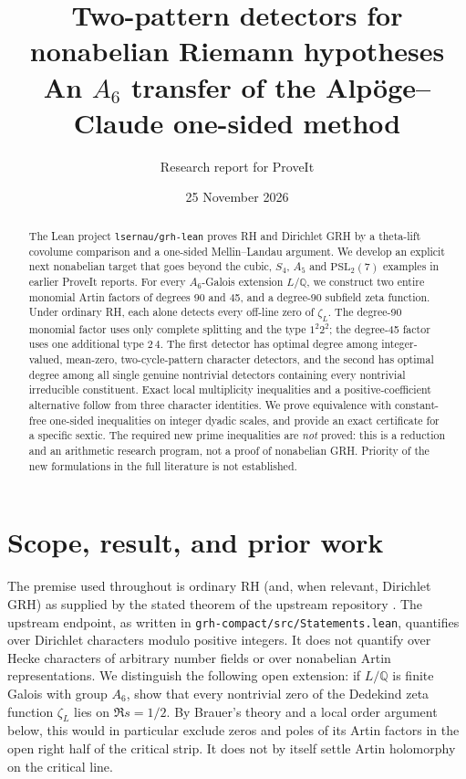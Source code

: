 \documentclass[11pt,letterpaper]{article}
\title{\color{ink}\bfseries Two-pattern detectors for nonabelian Riemann hypotheses\\[5pt]\large An $A_6$ transfer of the Alp\"oge--Claude one-sided method}
\author{Research report for ProveIt}
\date{25 November 2026}
\theoremstyle{remark}\newtheorem{remark}[theorem]{Remark}
\newcommand{\Q}{\mathbb Q}\newcommand{\C}{\mathbb C}\newcommand{\R}{\mathbb R}
\newcommand{\code}[1]{\nolinkurl{#1}}
\begin{document}
\maketitle
\begin{abstract}
The Lean project \code{lsernau/grh-lean} proves RH and Dirichlet GRH by a theta-lift covolume comparison and a one-sided Mellin--Landau argument. We develop an explicit next nonabelian target that goes beyond the cubic, $S_4$, $A_5$ and $\mathrm{PSL}_2(7)$ examples in earlier ProveIt reports. For every $A_6$-Galois extension $L/\Q$, we construct two entire monomial Artin factors of degrees 90 and 45, and a degree-90 subfield zeta function. Under ordinary RH, each alone detects every off-line zero of $\zeta_L$. The degree-90 monomial factor uses only complete splitting and the type $1^2 2^2$; the degree-45 factor uses one additional type $2\,4$. The first detector has optimal degree among integer-valued, mean-zero, two-cycle-pattern character detectors, and the second has optimal degree among all single genuine nontrivial detectors containing every nontrivial irreducible constituent. Exact local multiplicity inequalities and a positive-coefficient alternative follow from three character identities. We prove equivalence with constant-free one-sided inequalities on integer dyadic scales, and provide an exact certificate for a specific sextic. The required new prime inequalities are \emph{not} proved: this is a reduction and an arithmetic research program, not a proof of nonabelian GRH. Priority of the new formulations in the full literature is not established.
\end{abstract}

\tableofcontents

\section{Scope, result, and prior work}
The premise used throughout is ordinary RH (and, when relevant, Dirichlet GRH) as supplied by the stated theorem of the upstream repository \cite{upstream}. The upstream endpoint, as written in \code{grh-compact/src/Statements.lean}, quantifies over Dirichlet characters modulo positive integers. It does not quantify over Hecke characters of arbitrary number fields or over nonabelian Artin representations. We distinguish the following open extension: if $L/\Q$ is finite Galois with group $A_6$, show that every nontrivial zero of the Dedekind zeta function $\zeta_L$ lies on $\Re s=1/2$. By Brauer's theory and a local order argument below, this would in particular exclude zeros and poles of its Artin factors in the open right half of the critical strip. It does not by itself settle Artin holomorphy on the critical line.
\end{document}
